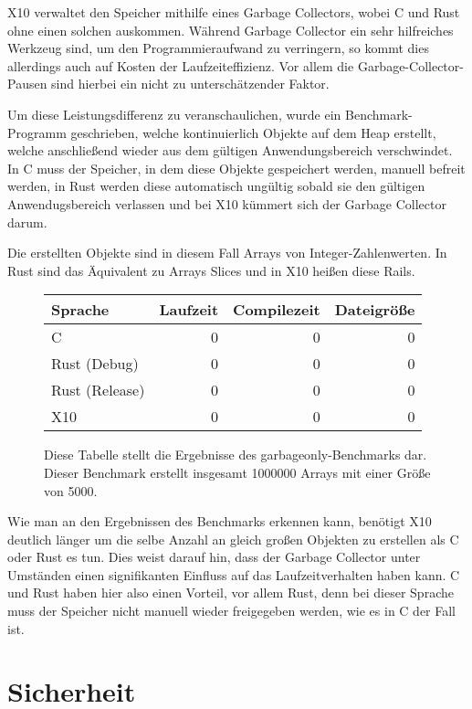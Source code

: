 X10 verwaltet den Speicher mithilfe eines Garbage Collectors, wobei C und Rust ohne einen solchen auskommen.
Während Garbage Collector ein sehr hilfreiches Werkzeug sind, um den Programmieraufwand zu verringern, so kommt dies
allerdings auch auf Kosten der Laufzeiteffizienz. Vor allem die Garbage-Collector-Pausen sind hierbei ein nicht zu unterschätzender
Faktor.

Um diese Leistungsdifferenz zu veranschaulichen, wurde ein Benchmark-Programm geschrieben, welche kontinuierlich
Objekte auf dem Heap erstellt, welche anschließend wieder aus dem gültigen Anwendungsbereich verschwindet. In C muss der
Speicher, in dem diese Objekte gespeichert werden, manuell befreit werden, in Rust werden diese automatisch ungültig
sobald sie den gültigen Anwendugsbereich verlassen und bei X10 kümmert sich der Garbage Collector darum.

Die erstellten Objekte sind in diesem Fall Arrays von Integer-Zahlenwerten. In Rust sind das Äquivalent
zu Arrays Slices und in X10 heißen diese Rails.

\begin{figure}[hb]
	\begin{center}
		\begin{tabular}{lrrr}
			\toprule
			Sprache & Laufzeit & Compilezeit & Dateigröße \\
			\midrule
			C & 0 & 0 & 0 \\
			Rust (Debug) & 0 & 0 & 0 \\
			Rust (Release) & 0 & 0 & 0 \\
			X10 & 0 & 0 & 0 \\
			\bottomrule
		\end{tabular}
	\end{center}
	\caption{
		Diese Tabelle stellt die Ergebnisse des garbageonly-Benchmarks dar. Dieser Benchmark erstellt insgesamt 1000000
		Arrays mit einer Größe von 5000.
	}
	\label{fig:garbageonly_table}
\end{figure}

Wie man an den Ergebnissen des Benchmarks erkennen kann, benötigt X10 deutlich länger um die selbe Anzahl an gleich großen
Objekten zu erstellen als C oder Rust es tun. Dies weist darauf hin, dass der Garbage Collector unter Umständen einen signifikanten
Einfluss auf das Laufzeitverhalten haben kann. C und Rust haben hier also einen Vorteil, vor allem Rust, denn
bei dieser Sprache muss der Speicher nicht manuell wieder freigegeben werden, wie es in C der Fall ist.


\section{Sicherheit}

